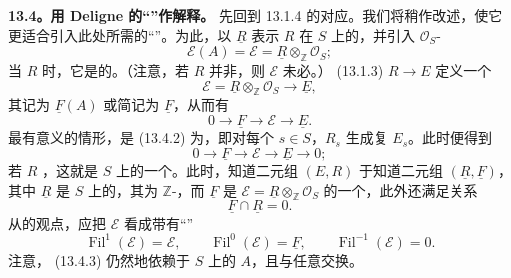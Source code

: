 \textbf{13.4。用 Deligne 的“”作解释。}
先回到 13.1.4 的对应。我们将稍作改述，使它更适合引入此处所需的“”。为此，以 $\underline R$ 表示 $R$ 在 $S$ 上的，并引入 $\mathcal O_S$-
\begin{equation}
 \mathscr E(A)=\mathscr E=\underline R\otimes_{\mathbb Z}\mathcal O_S;
 \tag{13.4.1}
\end{equation}
当 $R$ 时，它是的。（注意，若 $R$ 并非，则 $\mathscr E$ 未必。） (13.1.3) $R\to E$ 定义一个
\begin{equation}
 \mathscr E=\underline R\otimes_{\mathbb Z}\mathcal O_S\longrightarrow\underline E,
 \tag{13.4.2}
\end{equation}
其记为 $\underline F(A)$ 或简记为 $\underline F$，从而有
\begin{equation}
 0\longrightarrow\underline F\longrightarrow\mathscr E\longrightarrow\underline E.
 \tag{13.4.3}
\end{equation}
最有意义的情形，是 (13.4.2) 为，即对每个 $s\in S$，$R_s$ 生成复 $E_s$。此时便得到
\begin{equation}
 0\longrightarrow\underline F\longrightarrow\mathscr E\longrightarrow\underline E\longrightarrow0;
 \tag{13.4.4}
\end{equation}
若 $R$ ，这就是 $S$ 上的一个。此时，知道二元组 $(E,R)$ 于知道二元组 $(\underline R,\underline F)$，其中 $\underline R$ 是 $S$ 上的，其为 $\mathbb Z$-，而 $\underline F$ 是 $\mathscr E=\underline R\otimes_{\mathbb Z}\mathcal O_S$ 的一个，此外还满足关系
\begin{equation}
 \underline F\cap\underline R=0.
 \tag{13.4.5}
\end{equation}
从的观点，应把 $\mathscr E$ 看成带有“”
\begin{equation}
 \operatorname{Fil}^{1}(\mathscr E)=\mathscr E,\qquad
 \operatorname{Fil}^{0}(\mathscr E)=\underline F,\qquad
 \operatorname{Fil}^{-1}(\mathscr E)=0.
 \tag{13.4.6}
\end{equation}
注意， (13.4.3) 仍然地依赖于 $S$ 上的 $A$，且与任意交换。

